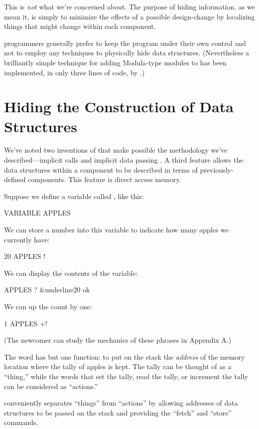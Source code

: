 This is \emph{not} what we're concerned about. The purpose of hiding
information, as we mean it, is simply to minimize the effects of a
possible design-change by localizing things that might change within
each component.

\Forth{} programmers generally prefer to keep the program under their own
control and not to employ any techniques to physically hide data
structures. (Nevertheless a brilliantly simple technique for adding
Modula-type modules to \Forth{} has been implemented, in only three lines
of code, by  \cite{shorre71}.)%
%


\section{Hiding the Construction of Data Structures}%
We've noted two inventions of \Forth{} that make possible the methodology
we've described---implicit calls and implicit data passing%
. A third
feature allows the data structures within a component to be described
in terms of previously-defined components. This feature is direct
access memory.

Suppose we define a variable called , like this:
\begin{Code}
VARIABLE APPLES
\end{Code}
We can store a number into this variable to indicate how many apples
we currently have:
\begin{Code}
20 APPLES !
\end{Code}
We can display the contents of the variable:
\begin{Code}[commandchars=\&\{\}]
APPLES ? &underline{20 ok}
\end{Code}
We can up the count by one:
\begin{Code}
1 APPLES +!
\end{Code}
(The newcomer can study the mechanics of these phrases in Appendix A.)

The word  has but one function: to put on the stack the
\emph{address} of the memory location where the tally of apples is
kept. The tally can be thought of as a ``thing,'' while the words that
set the tally, read the tally, or increment the tally can be
considered as ``actions.''

\Forth{} conveniently separates ``things'' from ``actions'' by allowing
addresses of data structures to be passed on the stack and providing
the ``fetch'' and ``store'' commands.

